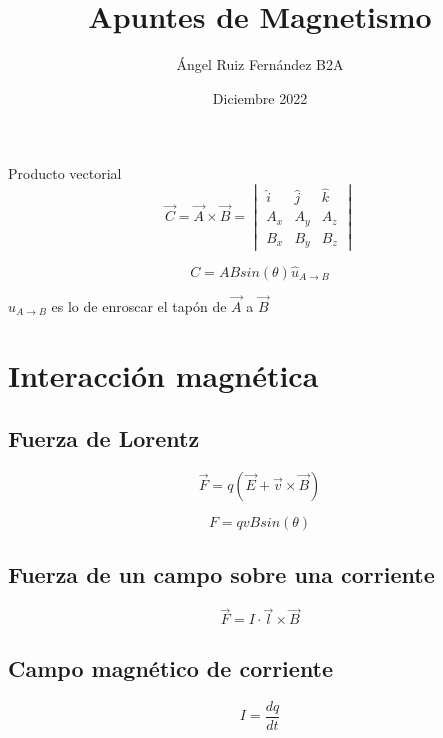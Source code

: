 \documentclass[12pt, letterpaper, twoside]{article}
\title{Apuntes de Magnetismo}
\author{Ángel Ruiz Fernández B2A}
\date{Diciembre 2022}
\begin{document}
	\maketitle
	
	Producto vectorial
	\begin{equation}
		\vec{C} = \vec{A} \times \vec{B} =
		\begin{vmatrix}
			\hat{i} & \hat{j} & \hat{k}\\
			A_x & A_y & A_z\\
			B_x & B_y & B_z
		\end{vmatrix}
	\end{equation}

	\begin{equation}
		C = AB sin(\theta) \hat{u}_{A\rightarrow B}
	\end{equation}
			
	$\hat{u}_{A\rightarrow B}$ es lo de enroscar el tapón de $\vec{A}$ a $\vec{B}$
	
	\section{Interacción magnética}
	
	\subsection{Fuerza de Lorentz}
	
	\begin{equation}
		\vec{F} = q ( \vec{E} + \vec{v} \times \vec{B})
	\end{equation}

	\begin{equation}
		F = q v B sin(\theta)
	\end{equation}
	
	\subsection{Fuerza de un campo sobre una corriente}
	
	\begin{equation}
		\vec{F} = I \cdot \vec{l} \times \vec{B}
	\end{equation}
	
	\subsection{Campo magnético de corriente}
	
	\begin{equation}
		I = \dfrac{dq}{dt}
	\end{equation}
	
\end{document}
